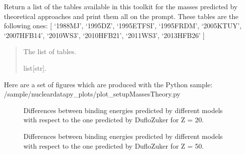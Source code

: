 \documentclass[letterpaper,10pt,english]{sphinxmanual}
\begin{document}
\begin{fulllineitems}
\label{\detokenize{source/api/setup_masses_theory:nucleardatapy.setup_masses_theory.tables_masses_theory}}
\pysigstartsignatures
\pysiglinewithargsret
{}
{}
{}
\pysigstopsignatures
\sphinxAtStartPar
Return a list of the tables available in this toolkit for the masses
predicted by theoretical approaches and print them all on the prompt.
These tables are the following ones:     {[} ‘1988\sphinxhyphen{}MJ’, ‘1995\sphinxhyphen{}DZ’, ‘1995\sphinxhyphen{}ETFSI’, ‘1995\sphinxhyphen{}FRDM’,     ‘2005\sphinxhyphen{}KTUY’, ‘2007\sphinxhyphen{}HFB14’, ‘2010\sphinxhyphen{}WS3’, ‘2010\sphinxhyphen{}HFB21’, ‘2011\sphinxhyphen{}WS3’, ‘2013\sphinxhyphen{}HFB26’ {]}
\begin{quote}\begin{description}
\sphinxAtStartPar
The list of tables.

\sphinxAtStartPar
list{[}str{]}.

\end{description}\end{quote}

\end{fulllineitems}


\sphinxAtStartPar
Here are a set of figures which are produced with the Python sample: /sample/nucleardatapy\_plots/plot\_setupMassesTheory.py

\begin{figure}[htbp]
\centering
\capstart

\noindent{}
\caption{Differences between binding energies predicted by different models with respect to the one predicted by Duflo\sphinxhyphen{}Zuker for Z = 20.}\label{\detokenize{source/api/setup_masses_theory:id1}}\end{figure}

\begin{figure}[htbp]
\centering
\capstart

\noindent{}
\caption{Differences between binding energies predicted by different models with respect to the one predicted by Duflo\sphinxhyphen{}Zuker for Z = 50.}\label{\detokenize{source/api/setup_masses_theory:id2}}\end{figure}
\end{document}
